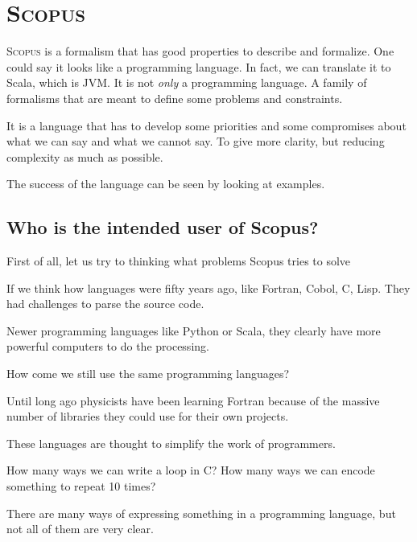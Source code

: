 \documentclass[12pt,a4paper]{article}
\newcommand{\Scopus}{\textsc{Scopus}\xspace}
\begin{document}


    \section{\Scopus}

    \Scopus is a formalism that has good properties to describe and formalize.
    One could say it looks like a programming language.
    In fact, we can translate it to Scala, which is JVM.
    It is not \textit{only} a programming language.
    A family of formalisms that are meant to define some problems and constraints.

    It is a language that has to develop some priorities and some compromises about what we can say and what we cannot say.
    To give more clarity, but reducing complexity as much as possible.

    The success of the language can be seen by looking at examples.

    \subsection{Who is the intended user of Scopus?}

    First of all, let us try to thinking what problems Scopus tries to solve

    If we think how languages were fifty years ago, like Fortran, Cobol, C, Lisp.
    They had challenges to parse the source code.

    Newer programming languages like Python or Scala, they clearly have more powerful computers to do the processing.

    How come we still use the same programming languages?

    Until long ago physicists have been learning Fortran because of the massive number of libraries they could use for their own projects.

    These languages are thought to simplify the work of programmers.

    How many ways we can write a loop in C? How many ways we can encode something to repeat 10 times?

    There are many ways of expressing something in a programming language, but not all of them are very clear.
\end{document}
